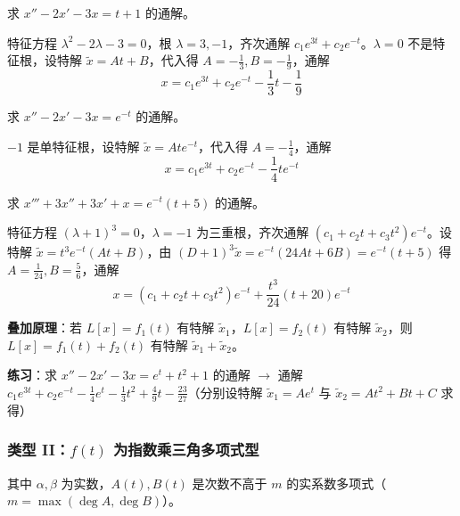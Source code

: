 \begin{example}
求 $x'' - 2x' - 3x = t + 1$ 的通解。
\end{example}

\begin{solution}
特征方程 $\lambda^2 - 2\lambda - 3 = 0$，根 $\lambda = 3, -1$，齐次通解 $c_1e^{3t} + c_2e^{-t}$。$\lambda = 0$ 不是特征根，设特解 $\tilde{x} = At + B$，代入得 $A = -\frac{1}{3}, B = -\frac{1}{9}$，通解
$$x = c_1e^{3t} + c_2e^{-t} - \frac{1}{3}t - \frac{1}{9}$$
\end{solution}

\begin{example}
求 $x'' - 2x' - 3x = e^{-t}$ 的通解。
\end{example}

\begin{solution}
$-1$ 是单特征根，设特解 $\tilde{x} = Ate^{-t}$，代入得 $A = -\frac{1}{4}$，通解
$$x = c_1e^{3t} + c_2e^{-t} - \frac{1}{4}te^{-t}$$
\end{solution}

\begin{example}
求 $x''' + 3x'' + 3x' + x = e^{-t}(t+5)$ 的通解。
\end{example}

\begin{solution}
特征方程 $(\lambda+1)^3 = 0$，$\lambda = -1$ 为三重根，齐次通解 $(c_1 + c_2t + c_3t^2)e^{-t}$。设特解 $\tilde{x} = t^3e^{-t}(At + B)$，由 $(D+1)^3\tilde{x} = e^{-t}(24At + 6B) = e^{-t}(t+5)$ 得 $A = \frac{1}{24}, B = \frac{5}{6}$，通解
$$x = (c_1 + c_2t + c_3t^2)e^{-t} + \frac{t^3}{24}(t + 20)e^{-t}$$
\end{solution}

\textbf{叠加原理}：若 $L[x] = f_1(t)$ 有特解 $\tilde{x}_1$，$L[x] = f_2(t)$ 有特解 $\tilde{x}_2$，则 $L[x] = f_1(t) + f_2(t)$ 有特解 $\tilde{x}_1 + \tilde{x}_2$。

\textbf{练习}：求 $x'' - 2x' - 3x = e^t + t^2 + 1$ 的通解 $\rightarrow$ 通解 $c_1e^{3t} + c_2e^{-t} - \frac{1}{4}e^t - \frac{1}{3}t^2 + \frac{4}{9}t - \frac{23}{27}$（分别设特解 $\tilde{x}_1 = Ae^t$ 与 $\tilde{x}_2 = At^2 + Bt + C$ 求得）

\subsubsection{类型 II：$f(t)$ 为指数乘三角多项式型}

其中 $\alpha, \beta$ 为实数，$A(t), B(t)$ 是次数不高于 $m$ 的实系数多项式（$m = \max(\deg A, \deg B)$）。

